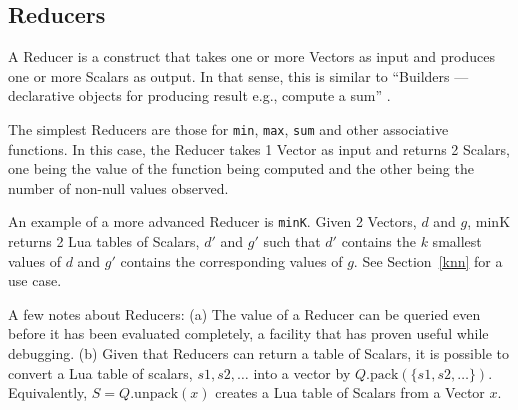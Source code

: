 \subsection{Reducers}
\label{reducers}

A Reducer is a construct that takes one or more Vectors as input and produces
one or more Scalars as output. In that sense, this is similar to ``Builders ---
declarative objects for producing result e.g., compute a sum'' \cite{Weld2017}.

The simplest Reducers are those for {\tt min},
{\tt max}, {\tt sum} and other associative functions. 
In this case, the Reducer takes 1 Vector as input and 
returns 2 Scalars, one
being the value of the function being computed and the other being the number of
non-null values observed. 

An example of a more advanced Reducer is {\tt minK}. 
Given 2 Vectors, \(d\) and \(g\), minK returns 2
Lua tables of Scalars, \(d'\) and \(g'\) such that \(d'\) contains the \(k\)
smallest values of \(d\) and \(g'\) contains the corresponding values of \(g\).
See Section~\ref{knn} for a use case.

A few notes about Reducers: (a) 
The value of a Reducer can be queried even before it has been evaluated 
completely, a facility that has proven useful while debugging. 
(b) Given that Reducers can return a table of Scalars,
it is possible to 
convert a Lua table of scalars, \(s1, s2, \ldots\) into a vector by
\(Q.\mathrm{pack}(\{s1, s2, \ldots\})\).
Equivalently, \(S = Q.\mathrm{unpack}(x)\) creates a Lua table of Scalars from a
Vector \(x\).

